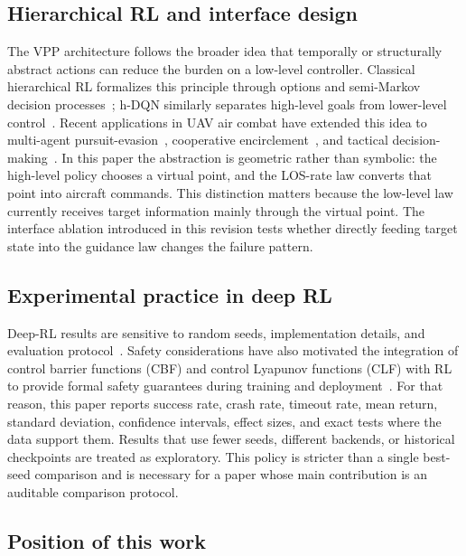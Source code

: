 \subsection{Hierarchical RL and interface design}

The VPP architecture follows the broader idea that temporally or structurally abstract actions can reduce the burden on a low-level controller. Classical hierarchical RL formalizes this principle through options and semi-Markov decision processes~\cite{sutton1999options,barto2003hrl,bacon2017option}; h-DQN similarly separates high-level goals from lower-level control~\cite{kulkarni2016hdqn}. Recent applications in UAV air combat have extended this idea to multi-agent pursuit-evasion~\cite{pope2021hrl,zhang2024tmc}, cooperative encirclement~\cite{yang2024drl}, and tactical decision-making~\cite{chai2023tsmc}. In this paper the abstraction is geometric rather than symbolic: the high-level policy chooses a virtual point, and the LOS-rate law converts that point into aircraft commands. This distinction matters because the low-level law currently receives target information mainly through the virtual point. The interface ablation introduced in this revision tests whether directly feeding target state into the guidance law changes the failure pattern.

\subsection{Experimental practice in deep RL}

Deep-RL results are sensitive to random seeds, implementation details, and evaluation protocol~\cite{henderson2018deep,patterson2023empirical}. Safety considerations have also motivated the integration of control barrier functions (CBF) and control Lyapunov functions (CLF) with RL to provide formal safety guarantees during training and deployment~\cite{ames2019cbf,marvi2021cbf,cheng2019cbf,wu2021clf}. For that reason, this paper reports success rate, crash rate, timeout rate, mean return, standard deviation, confidence intervals, effect sizes, and exact tests where the data support them. Results that use fewer seeds, different backends, or historical checkpoints are treated as exploratory. This policy is stricter than a single best-seed comparison and is necessary for a paper whose main contribution is an auditable comparison protocol.

\subsection{Position of this work}

